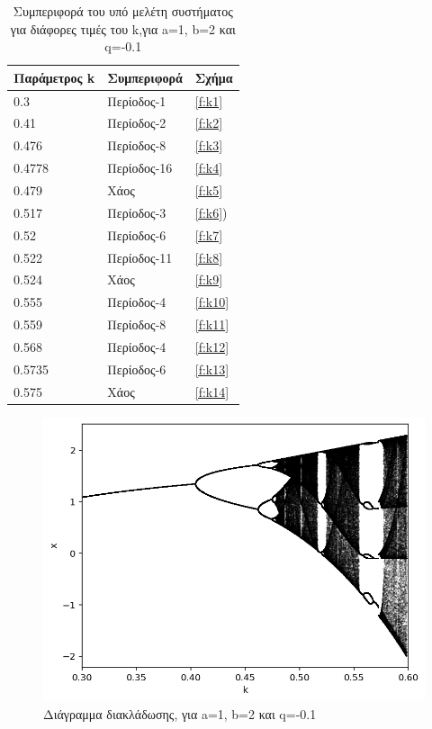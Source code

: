\begin{table}[h!]
	\centering
	\begin{tabular}{l | l | l}
		Παράμετρος k & Συμπεριφορά & Σχήμα\\
		\hline
		0.3 &  Περίοδος-1 & \ref{f:k1}\\
		0.41 & Περίοδος-2 & \ref{f:k2}\\
		0.476 &  Περίοδος-8 & \ref{f:k3}\\
		0.4778 & Περίοδος-16 & \ref{f:k4}\\
		0.479 & Χάος & \ref{f:k5}\\
		0.517 & Περίοδος-3 & \ref{f:k6})\\
		0.52 & Περίοδος-6 & \ref{f:k7}\\
		0.522 & Περίοδος-11 & \ref{f:k8}\\
		0.524 & Χάος & \ref{f:k9}\\
		0.555 & Περίοδος-4 & \ref{f:k10}\\
		0.559 & Περίοδος-8 & \ref{f:k11}\\
		0.568 & Περίοδος-4 & \ref{f:k12}\\
		0.5735 & Περίοδος-6 & \ref{f:k13}\\
		0.575 & Χάος & \ref{f:k14}\\
	\end{tabular}
	\caption{ Συμπεριφορά του υπό μελέτη συστήματος για διάφορες τιμές του k,για a=1, b=2 και q=-0.1}
	\label{tab:abc}
\end{table}


\begin{figure}[h!]
	\centering
	\includegraphics[width=0.8\linewidth]{LateX images/graphs/g1}
	\caption{ Διάγραμμα διακλάδωσης, για a=1, b=2 και q=-0.1}
	\label{f:g1}
\end{figure}



